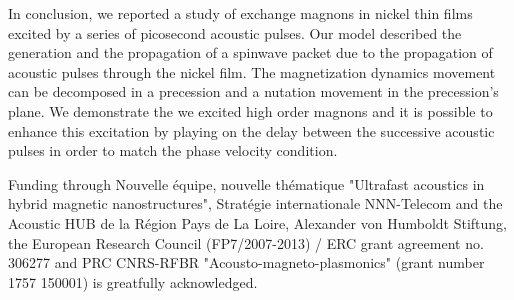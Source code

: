 \documentclass[%
superscriptaddress,
preprint,
showpacs,
amsmath,
amssymb,
aps,
prl,
]{revtex4-1}
\begin{document}

In conclusion, we reported a study of exchange magnons in nickel thin films excited by a series of picosecond acoustic pulses.
Our model described the generation and the propagation of a spinwave packet due to the propagation of acoustic pulses through the nickel film.
The magnetization dynamics movement can be decomposed in a precession and a nutation movement in the precession's plane.
We demonstrate the we excited high order magnons and it is possible to enhance this excitation by playing on the delay between the successive acoustic pulses in order to match the phase velocity condition.
	
\bigskip
	
Funding through Nouvelle \'{e}quipe, nouvelle th\'{e}matique "Ultrafast acoustics in hybrid magnetic nanostructures", Strat\'{e}gie internationale NNN-Telecom and the Acoustic HUB de la R\'{e}gion Pays de La Loire, Alexander von Humboldt Stiftung, the European Research Council (FP7/2007-2013) / ERC grant agreement no. 306277 and PRC CNRS-RFBR "Acousto-magneto-plasmonics" (grant number 1757 150001) is greatfully acknowledged.
	

	
\end{document}
